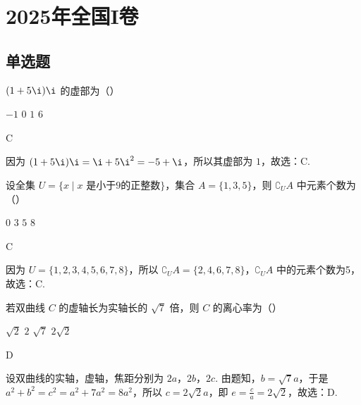 \chapter{2025年全国I卷}

\section{单选题}

\begin{problem}
\((1+5\i)\i\) 的虚部为（\quad）

\choices
    {\(-1\)}
    {\(0\)}
    {\(1\)}
    {\(6\)}
\end{problem}

\begin{answer}
C
\end{answer}

\begin{solution}
因为 \((1+5\i)\i=\i+5\i^2=-5+\i\)，所以其虚部为 \(1\)，故选：C.
\end{solution}

\begin{problem}
设全集 \(U=\{x \mid x \text{ 是小于9的正整数}\}\)，集合 \(A=\{1,3,5\}\)，则 \(\complement_U A\) 中元素个数为（\quad）

\choices
    {\(0\)}
    {\(3\)}
    {\(5\)}
    {\(8\)}
\end{problem}

\begin{answer}
C
\end{answer}

\begin{solution}
因为 \(U=\{1,2,3,4,5,6,7,8\}\)，所以 \(\complement_U A=\{2,4,6,7,8\}\)，\(\complement_U A\) 中的元素个数为5，故选：C.
\end{solution}

\begin{problem}
若双曲线 \(C\) 的虚轴长为实轴长的 \(\sqrt{7}\) 倍，则 \(C\) 的离心率为（\quad）

\choices
    {\(\sqrt{2}\)}
    {\(2\)}
    {\(\sqrt{7}\)}
    {\(2\sqrt{2}\)}
\end{problem}

\begin{answer}
D
\end{answer}

\begin{solution}
设双曲线的实轴，虚轴，焦距分别为 \(2a\)，\(2b\)，\(2c\). 由题知，\(b = \sqrt{7}a\)，于是
\(a^2+b^2=c^2=a^2+7a^2=8a^2\)，所以 \(c = 2\sqrt{2}a\)，即 \(e=\frac{c}{a}=2\sqrt{2}\)，故选：D.
\end{solution}

